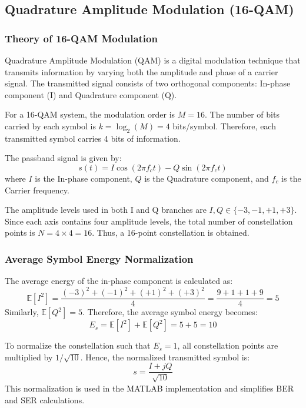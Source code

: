 \documentclass[a4paper]{article}
\begin{document}
\subsection{Quadrature Amplitude Modulation (16-QAM)}

\subsubsection{Theory of 16-QAM Modulation}
Quadrature Amplitude Modulation (QAM) is a digital modulation technique that transmits information by varying both the amplitude and phase of a carrier signal. The transmitted signal consists of two orthogonal components: In-phase component (I) and Quadrature component (Q).

For a 16-QAM system, the modulation order is $M = 16$. The number of bits carried by each symbol is $k = \log_2(M) = 4$ bits/symbol. Therefore, each transmitted symbol carries 4 bits of information.

The passband signal is given by:
\begin{equation}
s(t) = I \cos(2\pi f_c t) - Q \sin(2\pi f_c t)
\end{equation}
where $I$ is the In-phase component, $Q$ is the Quadrature component, and $f_c$ is the Carrier frequency.

The amplitude levels used in both I and Q branches are $I, Q \in \{-3, -1, +1, +3\}$. Since each axis contains four amplitude levels, the total number of constellation points is $N = 4 \times 4 = 16$. Thus, a 16-point constellation is obtained.

\subsubsection{Average Symbol Energy Normalization}
The average energy of the in-phase component is calculated as:
\begin{equation}
\mathbb{E}[I^2] = \frac{(-3)^2 + (-1)^2 + (+1)^2 + (+3)^2}{4} = \frac{9+1+1+9}{4} = 5
\end{equation}
Similarly, $\mathbb{E}[Q^2] = 5$. Therefore, the average symbol energy becomes:
\begin{equation}
E_s = \mathbb{E}[I^2] + \mathbb{E}[Q^2] = 5 + 5 = 10
\end{equation}

To normalize the constellation such that $E_s = 1$, all constellation points are multiplied by $1/\sqrt{10}$. Hence, the normalized transmitted symbol is:
\begin{equation}
s = \frac{I + jQ}{\sqrt{10}}
\end{equation}
This normalization is used in the MATLAB implementation and simplifies BER and SER calculations.
\end{document}
